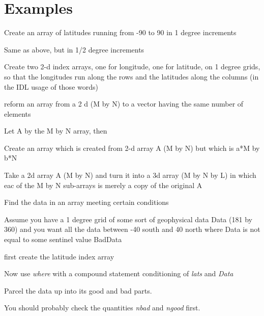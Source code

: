 \section{Examples}\label{sec:examples}

\bi

  \item Create an array of latitudes running from -90 to 90 in 1 degree
  increments


  \item Same as above, but in 1/2 degree increments


  \item  Create two 2-d index arrays, one for longitude, one for
  latitude, on 1 degree grids, so that the longitudes run along the rows
  and the latitudes along the columns (in the IDL usage of those words)



  \item reform an array from a 2 d (M by N) to a vector having the same
  number of elements

   Let A by the M by N array, then 


  \item Create an array which is created from 2-d array A (M by N) but
  which is a*M by b*N




  \item Take a 2d array A (M by N) and turn it into a 3d array (M by N
  by L) in which eac of the M by N sub-arrays is merely a copy of the
  original A


  \item Find the data in an array meeting certain conditions

  Assume you have a 1 degree grid of some sort of geophysical data
  Data (181 by 360) and you want all the data between -40 south and 40 north
  where Data is not equal to some sentinel value BadData

   first create the latitude index array


  Now use \textit{where} with a compound statement conditioning of
  \textit{lats} and \textit{Data}


   Parcel the data up into its good and bad parts.



    You should probably check the quantities \textit{nbad} and
    \textit{ngood} first.

  \item 

\ei